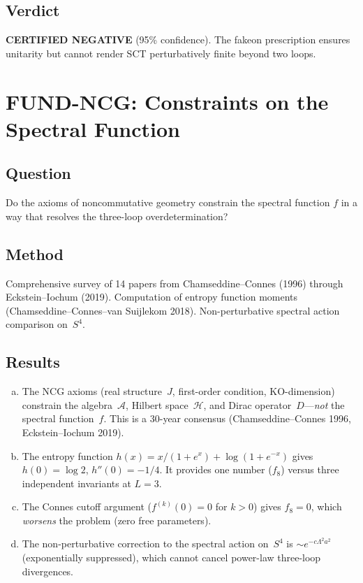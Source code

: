 \documentclass[12pt,a4paper]{article}
\newcommand{\Lam}{\Lambda}
\begin{document}
\subsection{Verdict}
\textcolor{long}{\textbf{CERTIFIED NEGATIVE}} (95\% confidence).  The fakeon
prescription ensures unitarity but cannot render SCT perturbatively finite beyond
two loops.

\section{FUND-NCG: Constraints on the Spectral Function}
\label{sec:ncg}

\subsection{Question}
Do the axioms of noncommutative geometry constrain the spectral function $f$ in a
way that resolves the three-loop overdetermination?

\subsection{Method}
Comprehensive survey of 14 papers from Chamseddine--Connes (1996) through
Eckstein--Iochum (2019).  Computation of entropy function moments
(Chamseddine--Connes--van Suijlekom 2018).  Non-perturbative spectral action
comparison on~$S^4$.

\subsection{Results}
\begin{enumerate}[(a)]
  \item The NCG axioms (real structure~$J$, first-order condition, KO-dimension)
    constrain the algebra~$\mathcal{A}$, Hilbert space~$\mathcal{H}$, and Dirac
    operator~$D$---\emph{not} the spectral function~$f$.  This is a 30-year
    consensus (Chamseddine--Connes 1996, Eckstein--Iochum 2019).
  \item The entropy function $h(x) = x/(1+e^x) + \log(1+e^{-x})$ gives
    $h(0) = \log 2$, $h''(0) = -1/4$.  It provides one number ($f_8$) versus
    three independent invariants at $L=3$.
  \item The Connes cutoff argument ($f^{(k)}(0) = 0$ for $k > 0$) gives
    $f_8 = 0$, which \emph{worsens} the problem (zero free parameters).
  \item The non-perturbative correction to the spectral action on~$S^4$ is
    $\sim e^{-c\Lam^2 a^2}$ (exponentially suppressed), which cannot cancel
    power-law three-loop divergences.
\end{enumerate}
\end{document}
